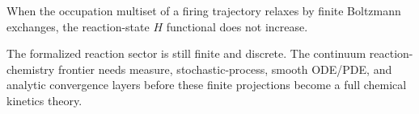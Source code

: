 \begin{theorem}\label{thm:reaction-entropy-relaxes}\leanok{}
When the occupation multiset of a firing trajectory relaxes by finite
Boltzmann exchanges, the reaction-state \(H\) functional does not increase.
\end{theorem}

\begin{theorem}\label{thm:reaction-continuum-frontier}\notready{}
The formalized reaction sector is still finite and discrete.  The continuum
reaction-chemistry frontier needs measure, stochastic-process, smooth ODE/PDE,
and analytic convergence layers before these finite projections become a full
chemical kinetics theory.
\end{theorem}
